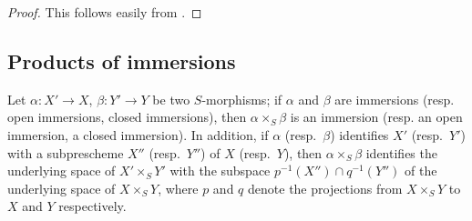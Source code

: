 \begin{proof}
This follows easily from .
\end{proof}

\subsection{Products of immersions}
\label{subsection:I.4.3}
\label{I.4.3}

\begin{proposition}[4.3.1]
\label{I.4.3.1}
Let $\alpha:X'\to X$, $\beta:Y'\to Y$ be two $S$-morphisms; if $\alpha$ and $\beta$ are immersions (resp. open immersions, closed immersions), then $\alpha\times_S\beta$ is an immersion (resp. an open immersion, a closed immersion).
In addition, if $\alpha$ (resp.~$\beta$) identifies $X'$ (resp.~$Y'$) with a subprescheme $X''$ (resp.~$Y''$) of $X$ (resp.~$Y$), then $\alpha\times_S\beta$ identifies the underlying space of $X'\times_S Y'$ with the subspace $p^{-1}(X'')\cap q^{-1}(Y'')$ of the underlying space of $X\times_S Y$, where $p$ and $q$ denote the projections from $X\times_S Y$ to $X$ and $Y$ respectively.
\end{proposition}

